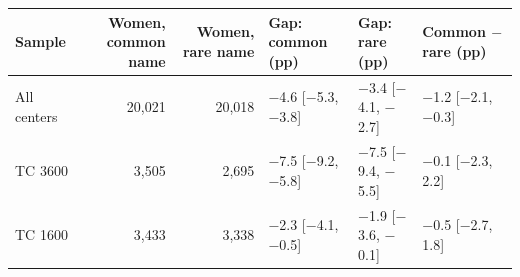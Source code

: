 \begin{tabular}{lrrlll}
\toprule
Sample & Women, common name & Women, rare name & Gap: common (pp) & Gap: rare (pp) & Common $-$ rare (pp) \\
\midrule
All centers & 20,021 & 20,018 & $-$4.6 [$-$5.3, $-$3.8] & $-$3.4 [$-$4.1, $-$2.7] & $-$1.2 [$-$2.1, $-$0.3] \\
TC 3600 & 3,505 & 2,695 & $-$7.5 [$-$9.2, $-$5.8] & $-$7.5 [$-$9.4, $-$5.5] & $-$0.1 [$-$2.3, 2.2] \\
TC 1600 & 3,433 & 3,338 & $-$2.3 [$-$4.1, $-$0.5] & $-$1.9 [$-$3.6, $-$0.1] & $-$0.5 [$-$2.7, 1.8] \\
\bottomrule
\end{tabular}
